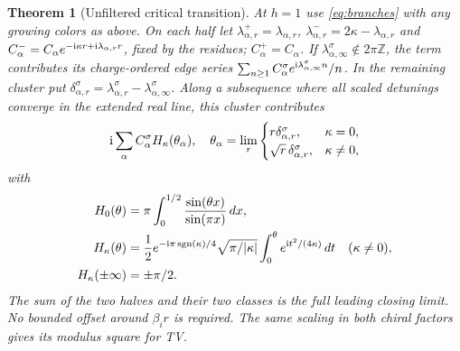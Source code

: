 \documentclass[11pt]{article}
\newtheorem{theorem}{Theorem}[section]
\newcommand\ZZ{\mathbb Z}
\newcommand\ii{{\rm i}}
\newcommand\sgn{\operatorname{sgn}}
\begin{document}
\begin{theorem}[Unfiltered critical transition]\label{thm:meso}
At \(h=1\) use \eqref{eq:branches} with any growing colors as above. On each half let \(\lambda^+_{\alpha,r}=\lambda_{\alpha,r}\), \(\lambda^-_{\alpha,r}=2\kappa-\lambda_{\alpha,r}\) and \(C^-_\alpha=C_\alpha e^{-\ii\kappa r+\ii\lambda_{\alpha,r}r}\), fixed by the residues; \(C^+_\alpha=C_\alpha\). If \(\lambda^\sigma_{\alpha,\infty}\notin2\pi\ZZ\), the term contributes its charge-ordered edge series \(\sum_{n\ge1}C^\sigma_\alpha e^{\ii\lambda^\sigma_{\alpha,\infty}n}/n\). In the remaining cluster put \(\delta_{\alpha,r}^\sigma=\lambda^\sigma_{\alpha,r}-\lambda^\sigma_{\alpha,\infty}\). Along a subsequence where all scaled detunings converge in the extended real line, this cluster contributes
\[
 \ii\sum_{\alpha} C^\sigma_\alpha H_\kappa(\theta_\alpha),\quad
 \theta_\alpha=\lim_r \begin{cases}r\delta_{\alpha,r}^\sigma,&\kappa=0,\\
          \sqrt r\,\delta_{\alpha,r}^\sigma,&\kappa\ne0,\end{cases}
\]
with
\begin{align*}
 H_0(\theta)&=\pi\int_0^{1/2}\frac{\sin(\theta x)}{\sin(\pi x)}\,dx,\\
 H_\kappa(\theta)&=\frac12 e^{-\ii\pi\sgn(\kappa)/4}\sqrt{\pi/|\kappa|}
                    \int_0^\theta e^{\ii t^2/(4\kappa)}\,dt\quad(\kappa\ne0),\\
 H_\kappa(\pm\infty)&=\pm\pi/2 .
\end{align*}
The sum of the two halves and their two classes is the full leading closing limit. No bounded offset around \(\beta_i r\) is required. The same scaling in both chiral factors gives its modulus square for TV.
\end{theorem}
\end{document}
